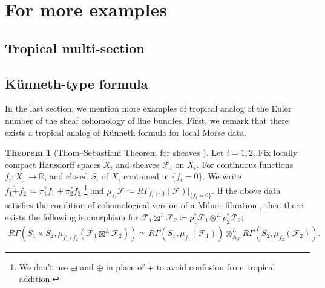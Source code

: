 \documentclass[a4paper,dvipdfmx,reqno,12pt]{amsart}
\theoremstyle{definition}
\newtheorem{theorem}{Theorem}[section]
\newcommand{\deq}{\coloneqq}
\newcommand{\mcal}[1]{\mathcal{#1}}%
\newcommand{\myfootnote}[1]{\hspace{-5pt}\footnote{#1}}
\numberwithin{equation}{section}
\begin{document}
\section{For more examples}

\subsection{Tropical multi-section}
\label{section-tropical-multi-section}

\subsection{K\"unneth-type formula}


In the last section, we mention more examples of 
tropical analog of the Euler number of 
the sheaf cohomology of line bundles.
First, we remark that there exists
a tropical analog of K\"unneth formula for 
local Morse data.

\begin{theorem}[{Thom--Sebastiani Theorem for sheaves \cite[Theorem 1.2.2]{MR2031639}}]
Let $i=1,2$.
Fix locally compact Hausdorff spaces $X_i$ and 
sheaves $\mathcal{F}_i$ on $X_i$.
For continuous functions $f_i\colon X_1 \to\mathbb{R}$,
and closed $S_i$ of $X_i$ contained in $\{f_i=0\}$.
We write $f_1\dot{+} f_2\deq \pi_1^{*}f_1+\pi_2^{*}f_2$
\myfootnote{
We don't use $\boxplus$ and $\oplus$ in place of
$\dot{+}$
to avoid confusion from tropical addition.}
and 
$\mu_{f_i}\mathcal{F}\deq R\Gamma_{f_i\geq 0}
(\mathcal{F})|_{\{f_i=0\}}$.
If the above data satisfies
the condition of cohomological version of a Milnor 
fibration \cite[Assumption 1.1.1]{MR2031639},
then there exists the following isomorphism 
for $\mcal{F}_1\boxtimes^{L} \mcal{F}_2\deq 
p_1^{*}\mcal{F}_1\otimes^{L}p^{*}_2\mcal{F}_2$;
\begin{align}
    R\Gamma(S_1\times S_2,\mu_{f_1\dot{+}f_2}(\mcal{F}_1\boxtimes^{L} \mcal{F}_2))
    \simeq R\Gamma(S_1,\mu_{f_1}(\mcal{F}_1))
    \otimes^{L}_{A_X}R\Gamma(S_2,\mu_{f_2}(\mcal{F}_2)).
\end{align}

\end{theorem}
\end{document}
